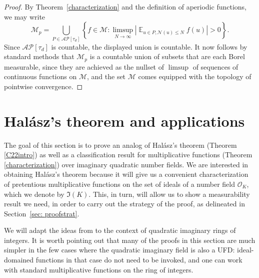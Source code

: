 \documentclass[11pt]{amsart}
\theoremstyle{definition}
\DeclareMathOperator*{\E}{\mathbb{E}}
\newcommand{\NN}{{\mathcal N}}
\begin{document}
\begin{proof}
By Theorem~\ref{characterization} and the definition of aperiodic functions, we may write 
\[
\mathcal{M}_p = \bigcup_{P\in\mathcal{AP}[\tau_{d}]} \left\{ f \in \mathcal{M} : \limsup_{N \to \infty} \left| \E_{u \in P, \NN(u) \leq N } f(u)\right|>0\right\}.
\]
Since $\mathcal{AP}[\tau_{d}]$ is countable, the displayed union is countable. It now follows by standard methods that $\mathcal{M}_p$ is a countable union of subsets that are each Borel measurable, since they are achieved as the nullset of $\limsup$ of sequences of continuous functions on $\mathcal{M}$, and the set $\mathcal{M}$ comes equipped with the topology of pointwise convergence.

\end{proof}
\iffalse
\section{Hal\'asz's theorem and applications}\label{SEChalasz}
The goal of this section is to prove an analog of Hal\'asz's theorem (Theorem \ref{C22intro}) as well as a classification result for multiplicative functions (Theorem \ref{characterization}) over imaginary quadratic number fields. We are interested in obtaining Hal\'asz's theorem  because it will give us a convenient characterization of pretentious multiplicative functions on the set of ideals of a number field $\mathcal{O}_K$, which we denote by $\mathfrak{I}(K)$. This, in turn, will allow us to show a measurability result we need, in order to carry out the strategy of the proof, as delineated in Section~\ref{sec: proofstrat}. 

We will adapt the ideas from \cite[Chapter~6]{E79book} to the context of quadratic imaginary rings of integers. It is worth pointing out that many of the proofs in this section are much simpler in the few cases where the quadratic imaginary field is also a UFD: ideal-domained functions in that case do not need to be invoked, and one can work with standard multiplicative functions on the ring of integers.
\end{document}
